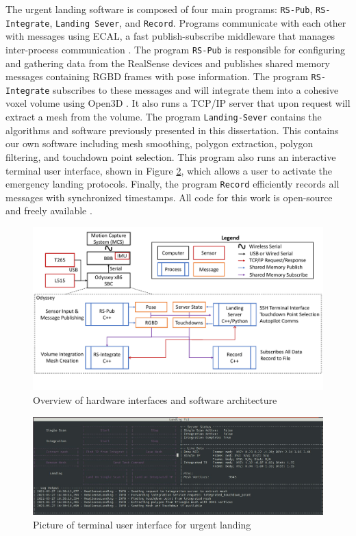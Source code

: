 The urgent landing software is composed of four main programs: \texttt{RS-Pub}, \texttt{RS-Integrate}, \texttt{Landing Sever}, and \texttt{Record}. Programs communicate with each other with messages using \ac{ECAL}, a fast publish-subscribe middleware that manages inter-process communication \cite{Continental_Github_ecal}. The program \texttt{RS-Pub} is responsible for configuring and gathering data from the RealSense devices and publishes shared memory messages containing \ac{RGBD} frames with pose information. The program \texttt{RS-Integrate} subscribes to these messages and will integrate them into a cohesive voxel volume using Open3D \cite{zhou_open3d_2018}. It also runs a TCP/IP server that upon request will extract a mesh from the volume. The program \texttt{Landing-Sever} contains the algorithms and software previously presented in this dissertation. This contains our own software including mesh smoothing, polygon extraction, polygon filtering, and touchdown point selection. This program also runs an interactive terminal user interface, shown in Figure \ref{fig:ch7_tui}, which allows a user to activate the emergency landing protocols. Finally, the program \texttt{Record} efficiently records all messages with synchronized timestamps. All code for this work is open-source and freely available \cite{Castagno_Github_realsensepackage}.

\begin{figure}[!tb]
    \centering  
    \includegraphics[page=1,clip,trim=0cm 0cm 0cm 0cm,width=.90\linewidth]{chapter_7_experiments/imgs/SoftwareOverview-v2.pdf}
    \caption[Overview of hardware interfaces and software architecture]{Overview of hardware interfaces and software architecture}\label{fig:ch7_software}
\end{figure}

\begin{figure}[!tb]
    \centering  
    \includegraphics[page=1,clip,trim=0cm 0cm 0cm 0cm,width=.95\linewidth]{chapter_7_experiments/imgs/SensorPackage_TUI.pdf}
    \caption[Picture of terminal user interface for urgent landing]{Picture of terminal user interface for urgent landing}\label{fig:ch7_tui}
\end{figure}

